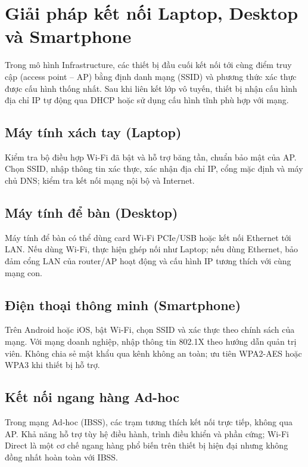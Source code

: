 \section{Giải pháp kết nối Laptop, Desktop và Smartphone}
\label{sec:device-connectivity}

Trong mô hình Infrastructure, các thiết bị đầu cuối kết nối tới cùng điểm truy
cập (access point -- AP) bằng định danh mạng (SSID) và phương thức xác thực
được cấu hình thống nhất. Sau khi liên kết lớp vô tuyến, thiết bị nhận cấu hình
địa chỉ IP tự động qua DHCP hoặc sử dụng cấu hình tĩnh phù hợp với mạng.

\subsection{Máy tính xách tay (Laptop)}
Kiểm tra bộ điều hợp Wi-Fi đã bật và hỗ trợ băng tần, chuẩn bảo mật của AP. Chọn
SSID, nhập thông tin xác thực, xác nhận địa chỉ IP, cổng mặc định và máy chủ DNS;
kiểm tra kết nối mạng nội bộ và Internet.

\subsection{Máy tính để bàn (Desktop)}
Máy tính để bàn có thể dùng card Wi-Fi PCIe/USB hoặc kết nối Ethernet tới LAN.
Nếu dùng Wi-Fi, thực hiện ghép nối như Laptop; nếu dùng Ethernet, bảo đảm cổng
LAN của router/AP hoạt động và cấu hình IP tương thích với cùng mạng con.

\subsection{Điện thoại thông minh (Smartphone)}
Trên Android hoặc iOS, bật Wi-Fi, chọn SSID và xác thực theo chính sách của
mạng. Với mạng doanh nghiệp, nhập thông tin 802.1X theo hướng dẫn quản trị viên.
Không chia sẻ mật khẩu qua kênh không an toàn; ưu tiên WPA2-AES hoặc WPA3 khi
thiết bị hỗ trợ.

\subsection{Kết nối ngang hàng Ad-hoc}
Trong mạng Ad-hoc (IBSS), các trạm tương thích kết nối trực tiếp, không qua AP.
Khả năng hỗ trợ tùy hệ điều hành, trình điều khiển và phần cứng; Wi-Fi Direct
là một cơ chế ngang hàng phổ biến trên thiết bị hiện đại nhưng không đồng nhất
hoàn toàn với IBSS.
